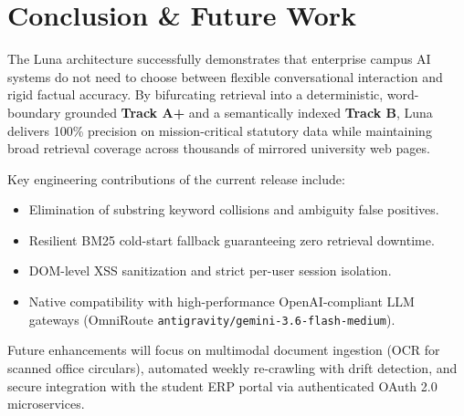 \documentclass[11pt,a4paper]{article}
\begin{document}
\section{Conclusion \& Future Work}

The Luna architecture successfully demonstrates that enterprise campus AI systems do not need to choose between flexible conversational interaction and rigid factual accuracy. By bifurcating retrieval into a deterministic, word-boundary grounded \textbf{Track A+} and a semantically indexed \textbf{Track B}, Luna delivers 100\% precision on mission-critical statutory data while maintaining broad retrieval coverage across thousands of mirrored university web pages.

Key engineering contributions of the current release include:
\begin{itemize}
    \item Elimination of substring keyword collisions and ambiguity false positives.
    \item Resilient BM25 cold-start fallback guaranteeing zero retrieval downtime.
    \item DOM-level XSS sanitization and strict per-user session isolation.
    \item Native compatibility with high-performance OpenAI-compliant LLM gateways (OmniRoute \texttt{antigravity/gemini-3.6-flash-medium}).
\end{itemize}

Future enhancements will focus on multimodal document ingestion (OCR for scanned office circulars), automated weekly re-crawling with drift detection, and secure integration with the student ERP portal via authenticated OAuth 2.0 microservices.
\end{document}
